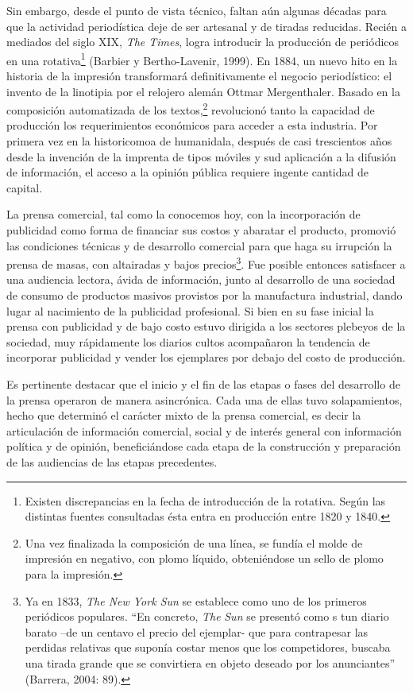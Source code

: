 {Sin embargo, desde el punto de vista técnico, faltan aún algunas décadas para que la actividad periodística deje de ser artesanal y de tiradas reducidas. Recién a mediados del siglo XIX, \emph{The Times}, logra introducir la producción de periódicos en una rotativa\footnote{Existen discrepancias en la fecha de introducción de la rotativa. Según las distintas fuentes consultadas ésta entra en producción entre 1820 y 1840.} (Barbier y Bertho-Lavenir, 1999). En 1884, un nuevo hito en la historia de la impresión transformará definitivamente el negocio periodístico: el invento de la linotipia por el relojero alemán Ottmar Mergenthaler. Basado en la composición automatizada de los textos,\footnote{Una vez finalizada la composición de una línea, se fundía el molde de impresión en negativo, con plomo líquido, obteniéndose un sello de plomo para la impresión.} revolucionó tanto la capacidad de producción  los requerimientos económicos para acceder a esta industria. Por primera vez en la historicomoa de  humanidala, después de casi trescientos años desde la invención de la imprenta de tipos móviles y sud aplicación a la difusión de información, el acceso a la opinión pública requiere ingente cantidad de capital.

La prensa comercial, tal como la conocemos hoy, con la incorporación de publicidad como forma de financiar sus costos y abaratar el producto, promovió las condiciones técnicas y de desarrollo comercial para que haga su irrupción la prensa de masas, con altairadas y bajos precios\footnote{Ya en 1833, \emph{The New York Sun} se establece como uno de los primeros periódicos populares. \enquote{En concreto, \emph{The} \emph{Sun} se presentó como s tun diario barato --de un centavo el precio del ejemplar- que para contrapesar las perdidas relativas que suponía costar menos que los competidores, buscaba una tirada grande que se convirtiera en objeto deseado por los anunciantes} (Barrera, 2004: 89).}. Fue posible entonces satisfacer a una audiencia lectora, ávida de información, junto al desarrollo de una sociedad de consumo de productos masivos provistos por la manufactura industrial, dando lugar al nacimiento de la publicidad profesional. Si bien en su fase inicial la prensa con publicidad y de bajo costo estuvo dirigida a los sectores plebeyos de la sociedad, muy rápidamente los diarios cultos acompañaron la tendencia de incorporar publicidad y vender los ejemplares por debajo del costo de producción.

Es pertinente destacar que el inicio y el fin de las etapas o fases del desarrollo de la prensa operaron de manera asincrónica. Cada una de ellas tuvo solapamientos, hecho que determinó el carácter mixto de la prensa comercial, es decir la articulación de información comercial, social y de interés general con información política y de opinión, beneficiándose cada etapa de la construcción y preparación de las audiencias de las etapas precedentes.

}
